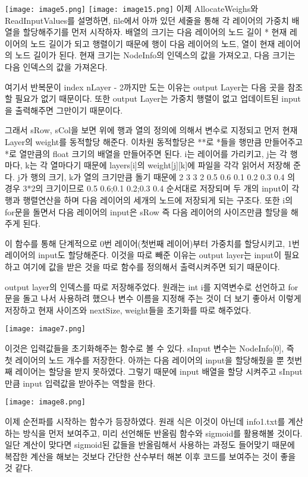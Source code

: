 \documentclass[12pt,a4paper]{article}
\begin{document}
\texttt{[image: image5.png]}
\texttt{[image: image15.png]}
이제 AllocateWeighs와 ReadInputValues를 설명하면, file에서 아까 있던 세줄을 통해 
각 레이어의 가중치 배열을 할당해주기를 먼저 시작하자.
배열의 크기는 다음 레이어의 노드 길이 * 현재 레이어의 노드 길이가 되고
행렬이기 때문에 행이 다음 레이어의 노드, 열이 현재 레이어의 노드 길이가 된다.
현재 크기는 NodeInfo의 인덱스의 값을 가져오고, 다음 크기는 다음 인덱스의 값을 가져온다.

여기서 반복문이 index nLayer - 2까지만 도는 이유는 output Layer는 다음 곳을 참조할 필요가 없기 때문이다.
또한 output Layer는 가중치 행렬이 없고 업데이트된 input을 출력해주면 그만이기 때문이다.

그래서 sRow, sCol을 보면 위에 행과 열의 정의에 의해서 변수로 지정되고
먼저 현재 Layer의 weight를 동적할당 해준다.
이차원 동적할당은 **로 *들을 행만큼 만들어주고
*로 열만큼의 float 크기의 배열을 만들어주면 된다.
i는 레이어를 가리키고, j는 각 행마다, k는 각 열마다기 때문에
layers[i]의 weight[j][k]에 파일을 각각 읽어서 저장해 준다.
j가 행의 크기, k가 열의 크기만큼 돌기 때문에
2 3 3 2            
0.5 0.6 0.1 0.2 0.3 0.4
의 경우 3*2의 크기이므로 
0.5 0.6;0.1 0.2;0.3 0.4 순서대로 저장되며
두 개의 input이 각 행과 행렬연산을 하며 다음 레이어의 세개의 노드에 저장되게 되는 구조다.
또한 i의 for문을 돌면서 다음 레이어의 input은 sRow 즉 다음 레이어의 사이즈만큼 할당을 해주게 된다.

이 함수를 통해 단계적으로 0번 레이어(첫번째 레이어)부터
가중치를 할당시키고, 1번 레이어의 input도 할당해준다.
이것을 따로 빼준 이유는 output layer는 input이 필요하고 여기에 값을 받은 것을
따로 함수를 정의해서 출력시켜주면 되기 때문이다.

output layer의 인덱스를 따로 저장해주었다.
원래는 int i를 지역변수로 선언하고 for문을 돌고 나서 사용하려 했으나
변수 이름을 지정해 주는 것이 더 보기 좋아서 이렇게 저장하고
현재 사이즈와 nextSize, weight들을 초기화를 따로 해주었다.


\texttt{[image: image7.png]}

이것은 입력값들을 초기화해주는 함수로 볼 수 있다.
sInput 변수는 NodeInfo[0], 즉 첫 레이어의 노드 개수를 저장한다.
아까는 다음 레이어의 input을 할당해줬을 뿐 첫번째 레이어는 할당을 받지 못하였다.
그렇기 때문에 input 배열을 할당 시켜주고 sInput만큼 input 입력값을 받아주는 역할을 한다.

\texttt{[image: image8.png]}

이제 순전파를 시작하는 함수가 등장하였다. 원래 식은 이것이 아닌데 info1.txt를 계산하는
방식을 먼저 보여주고, 미리 선언해둔 반올림 함수와 sigmoid를 활용해볼 것이다.
일단 계산이 맞다면 sigmoid된 값들을 반올림해서 사용하는 과정도 들어맞기 때문에
복잡한 계산을 해보는 것보다 간단한 산수부터 해본 이후 코드를 보여주는 것이 좋을 것 같다.
\end{document}
